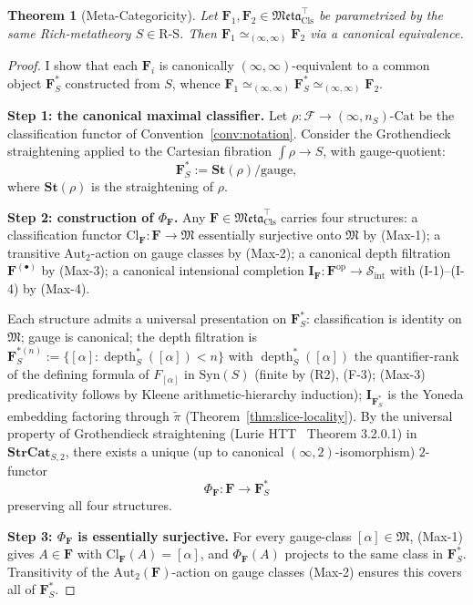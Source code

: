 \documentclass[11pt]{article}
\theoremstyle{plain}
\newtheorem{theorem}{Theorem}[section]
\theoremstyle{definition}
\newcommand{\RS}{\mathrm{R\text{-}S}}
\newcommand{\cS}{\mathcal{S}}
\newcommand{\cF}{\mathcal{F}}
\newcommand{\fM}{\mathfrak{M}}
\newcommand{\Meta}{\mathfrak{Meta}}
\newcommand{\Sint}{\cS_{\mathrm{int}}}
\newcommand{\Cl}{\mathrm{Cl}}
\newcommand{\Cat}{\mathrm{Cat}}
\newcommand{\Syn}{\mathrm{Syn}}
\newcommand{\II}{\mathbf{I}}
\DeclareMathOperator{\dep}{depth}
\begin{document}
\begin{theorem}[Meta-Categoricity]\label{thm:meta-cat}
Let $\mathbf{F}_1, \mathbf{F}_2 \in \Meta_{\mathrm{Cls}}^{\top}$ be parametrized by the same Rich-metatheory $S \in \RS$. Then $\mathbf{F}_1 \simeq_{(\infty, \infty)} \mathbf{F}_2$ via a canonical equivalence.
\end{theorem}

\begin{proof}
I show that each $\mathbf{F}_i$ is canonically $(\infty, \infty)$-equivalent to a common object $\mathbf{F}_S^*$ constructed from $S$, whence $\mathbf{F}_1 \simeq_{(\infty, \infty)} \mathbf{F}_S^* \simeq_{(\infty, \infty)} \mathbf{F}_2$.

\textbf{Step 1: the canonical maximal classifier.} Let $\rho : \cF \to (\infty, n_S)\text{-}\Cat$ be the classification functor of Convention~\ref{conv:notation}. Consider the Grothendieck straightening applied to the Cartesian fibration $\int \rho \to S$, with gauge-quotient:
\[ \mathbf{F}_S^* := \mathbf{St}(\rho) / \mathrm{gauge}, \]
where $\mathbf{St}(\rho)$ is the straightening of $\rho$.

\textbf{Step 2: construction of $\Phi_\mathbf{F}$.} Any $\mathbf{F} \in \Meta_{\mathrm{Cls}}^{\top}$ carries four structures: a classification functor $\Cl_{\mathbf{F}} : \mathbf{F} \to \fM$ essentially surjective onto $\fM$ by (Max-1); a transitive $\mathrm{Aut}_2$-action on gauge classes by (Max-2); a canonical depth filtration $\mathbf{F}^{(\bullet)}$ by (Max-3); a canonical intensional completion $\II_{\mathbf{F}} : \mathbf{F}^{\mathrm{op}} \to \Sint$ with (I-1)--(I-4) by (Max-4).

Each structure admits a universal presentation on $\mathbf{F}_S^*$: classification is identity on $\fM$; gauge is canonical; the depth filtration is $\mathbf{F}_S^{*(n)} := \{[\alpha] : \dep_S^*([\alpha]) < n\}$ with $\dep_S^*([\alpha])$ the quantifier-rank of the defining formula of $F_{[\alpha]}$ in $\Syn(S)$ (finite by (R2), (F-3); (Max-3) predicativity follows by Kleene arithmetic-hierarchy induction); $\II_{\mathbf{F}_S^*}$ is the Yoneda embedding factoring through $\tilde\pi$ (Theorem~\ref{thm:slice-locality}). By the universal property of Grothendieck straightening (Lurie HTT~\cite{LurieHTT} Theorem 3.2.0.1) in $\mathbf{StrCat}_{S, 2}$, there exists a unique (up to canonical $(\infty, 2)$-isomorphism) $2$-functor
\[ \Phi_\mathbf{F} : \mathbf{F} \to \mathbf{F}_S^* \]
preserving all four structures.

\textbf{Step 3: $\Phi_\mathbf{F}$ is essentially surjective.} For every gauge-class $[\alpha] \in \fM$, (Max-1) gives $A \in \mathbf{F}$ with $\Cl_\mathbf{F}(A) = [\alpha]$, and $\Phi_\mathbf{F}(A)$ projects to the same class in $\mathbf{F}_S^*$. Transitivity of the $\mathrm{Aut}_2(\mathbf{F})$-action on gauge classes (Max-2) ensures this covers all of $\mathbf{F}_S^*$.


\end{proof}
\end{document}
